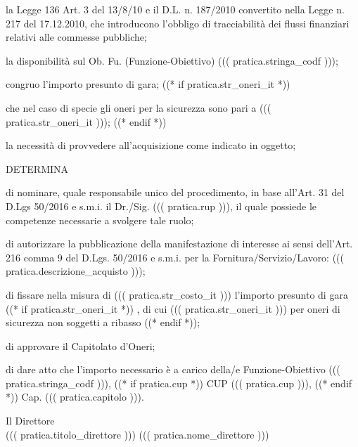 \documentclass[a4paper,12pt]{letter}
\begin{document}
\begin{list}{VALUTATA}{}
\item[VISTA] la Legge 136 Art. 3 del 13/8/10 e il D.L. n. 187/2010 convertito
	nella Legge n. 217 del 17.12.2010, che introducono l'obbligo di
	tracciabilità dei flussi finanziari relativi alle commesse pubbliche; 
\item[VISTA] la disponibilità sul Ob. Fu. (Funzione-Obiettivo) ((( pratica.stringa_codf ))); 
\item[VALUTATO] congruo l'importo presunto di gara;
((* if pratica.str_oneri_it *))
\item[RILEVATO] che nel caso di specie gli oneri per la sicurezza sono pari
	a ((( pratica.str_oneri_it )));
((* endif *))
\item[VALUTATA] la necessità di provvedere all'acquisizione come indicato in oggetto;
\end{list}

\begin{center}
DETERMINA
\end{center}

\begin{list}{VALUTATA}{}
\item[Art.~1:] di nominare, quale responsabile unico del procedimento, in base 
           all'Art. 31 del D.Lgs 50/2016 e s.m.i. il Dr./Sig. ((( pratica.rup ))),
           il quale possiede le competenze necessarie a svolgere tale ruolo; 
\item[Art.~2:] di autorizzare la pubblicazione della manifestazione di interesse
	ai sensi dell’Art. 216 comma 9 del D.Lgs. 50/2016 e s.m.i.
        per la Fornitura/Servizio/Lavoro: ((( pratica.descrizione_acquisto )));

\item[Art.~3:] di fissare nella misura di ((( pratica.str_costo_it ))) l'importo presunto di gara%
((* if pratica.str_oneri_it *))%
, di cui ((( pratica.str_oneri_it ))) per oneri di sicurezza non soggetti a ribasso%
((* endif *));

\item[Art.~4:] di approvare il Capitolato d'Oneri;

\item[Art.~5:] di dare atto che l'importo necessario è a carico della/e Funzione-Obiettivo ((( pratica.stringa_codf ))), ((* if pratica.cup *)) CUP ((( pratica.cup ))), ((* endif *)) Cap. ((( pratica.capitolo ))).
\end{list}

\vspace{0.5cm}

\begin{flushright}
\begin{minipage}[t]{6cm}
\begin{center}
Il Direttore \\
((( pratica.titolo_direttore ))) ((( pratica.nome_direttore )))
\end{center}
\end{minipage}
\end{flushright}
\end{document}
